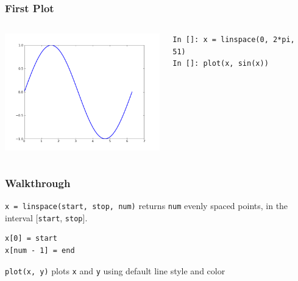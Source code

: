 \documentclass[14pt,compress]{beamer}
\newcommand{\typ}[1]{\lstinline{#1}}
\begin{document}
\begin{frame}[fragile]
\frametitle{First Plot}
\begin{columns}
    \hspace*{-0.5in}
  \includegraphics[height=2in, interpolate=true]{data/firstplot}
    \begin{block}{}
    \begin{small}
\begin{lstlisting}
In []: x = linspace(0, 2*pi, 51)
In []: plot(x, sin(x))
\end{lstlisting}
    \end{small}
    \end{block}
\end{columns}
\end{frame}


\begin{frame}[fragile]
\frametitle{Walkthrough}
\begin{block}{\typ{x = linspace(start, stop, num)} }
returns \typ{num} evenly spaced points, in the interval [\typ{start}, \typ{stop}].
\end{block}
\begin{lstlisting}
x[0] = start
x[num - 1] = end
\end{lstlisting}
\vspace*{.35in}
\begin{block}{\typ{plot(x, y)}}
plots \typ{x} and \typ{y} using default line style and color
\end{block}
\end{frame}
\end{document}
